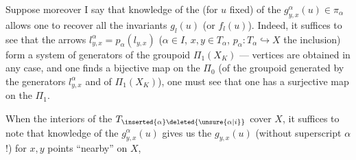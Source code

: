 
Suppose moreover    I say that knowledge of the (for $u$ fixed) of the $g_{y,x}^\alpha(u)\in\pi_\alpha$  allows one to recover all the invariants $g_l(u)$ (or $f_l(u)$). Indeed, it suffices to see that the arrows $l_{y,x}^\alpha=p_\alpha(l_{y,x})$ ($\alpha\in I$, $x,y\in T_\alpha$, $p_\alpha:T_\alpha\hookrightarrow X$ the inclusion)  form a system of generators of the groupoid $\Pi_1(X_K)$ ---    vertices are obtained in any case, and one finds a bijective map on the $\Pi_0$ (of the groupoid generated by the generators $l_{y,x}^\alpha$  and of $\Pi_1(X_K)$), one must see that one has a surjective map on the $\Pi_1$.

When the interiors of the $T_{\inserted{\alpha}\deleted{\unsure{\alpha|i}}}$ cover $X$, it suffices to note that knowledge of the $g_{y,x}^{\alpha}(u)$ gives us the $g_{y,x}(u)$ (without superscript $\alpha$ !) for $x,y$ points ``nearby'' on $X$,
